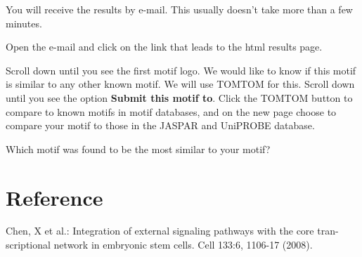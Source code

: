 \begin{note}
You will receive the results by e-mail. This usually doesn't take more than a few minutes.
\end{note}

\begin{steps}
Open the e-mail and click on the link that leads to the html results page.

Scroll down until you see the first motif logo. We would like to know if this
motif is similar to any other known motif. We will use TOMTOM for this. Scroll
down until you see the option \textbf{Submit this motif to}. Click the TOMTOM
button to compare to known motifs in motif databases, and on the new page choose
to compare your motif to those in the JASPAR and UniPROBE database.
\end{steps}


\begin{questions}
Which motif was found to be the most similar to your motif?
\begin{answer}
\end{answer}
\end{questions}

\newpage
\section{Reference}
Chen, X et al.: Integration of external signaling pathways with the core tran-scriptional network in embryonic stem cells. Cell 133:6, 1106-17 (2008).
